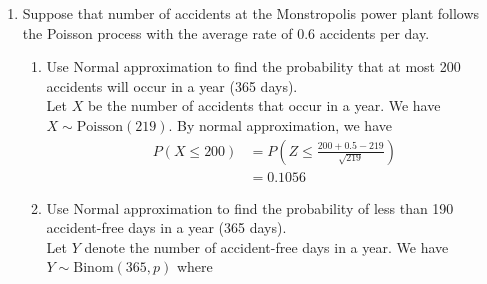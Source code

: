 \documentclass[12pt]{article} %
\newcommand{\Red}{\color{Red}}
\begin{document}
\begin{enumerate}
\begin{enumerate}
{$$\begin{aligned}
		    p &= P(X < 20.8) \\
            &= P(Z < (20.8-21)/0.4) \\
            &= P(Z < -0.5) \\
            &= 0.3085
		\end{aligned}$$ By normal approximation we have $$\begin{aligned}
		    P(Y \leq 34) &= P\left( Z \leq \frac{34+0.5-30.85}{\sqrt{21.3328}} \right) \\
            &= P(Z \leq 0.79) \\
            &= 0.7852
		\end{aligned}$$
		(R: \texttt{p <- pnorm(20.8, 21, 0.4); pnorm(34.5, 100*p, sqrt(100*p*(1-p)))} gives 0.7851)}
		\item Let $\bar{X}$ equal the sample mean of the 100 mints selected and weighed on a particular shift. Find $P(21.03 \leq \bar{X} \leq 21.04)$. \\ {\Red Since each $X_i$ is normal, $\bar{X} \sim N(21, 0.16/100)$ exactly. We have $$\begin{aligned}
		    P(21.03 \leq \bar{X} \leq 21.04) &= P\left(\frac{21.03-21}{\sqrt{0.16/100}} \leq \frac{\bar{X}-21}{\sqrt{0.16/100}} \leq \frac{21.04-21}{\sqrt{0.16/100}}\right) \\
            &= P(0.75 \leq Z \leq 1) \\
            &= 0.8413-0.7734\\
            &= 0.0679
		\end{aligned}$$}
	\end{enumerate}
\newpage
\item Suppose that number of accidents at the Monstropolis power plant follows the Poisson process with the average rate of 0.6 accidents per day. 
\begin{enumerate}
\item Use Normal approximation to find the probability that at most 200 accidents will occur in a year (365 days). \\ {\Red Let $X$ be the number of accidents that occur in a year. We have $X \sim \text{Poisson}(219)$. By normal approximation, we have $$\begin{aligned}
    P(X \leq 200) &= P\left( Z \leq \frac{200+0.5-219}{\sqrt{219}} \right) \\
    &= 0.1056
\end{aligned}$$}
\item Use Normal approximation to find the probability of less than 190 accident-free days in a year (365 days). \\ {\Red Let $Y$ denote the number of accident-free days in a year. We have $Y \sim \text{Binom}(365, p)$ where $$\begin{aligned}

\end{aligned}$$}
\end{enumerate}
\end{enumerate}
\end{document}
